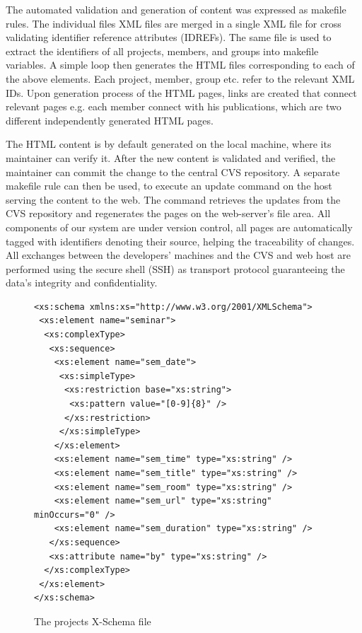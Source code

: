 \documentclass[10pt]{article}
\begin{document}
The automated validation and generation of content was
expressed as makefile rules.
The individual files XML files are merged in a
single XML file for cross validating identifier
reference attributes (IDREFs).
The same file is used to extract the identifiers of
all projects, members, and groups into makefile
variables.
A simple loop then generates the HTML files
corresponding to each of the above elements.
Each project, member, group etc. refer to the relevant XML IDs.
Upon generation process of the HTML pages, links are created that
connect relevant pages e.g. each member connect with his publications, 
which are two different independently generated HTML pages.

The HTML content is by default generated on the
local machine, where its maintainer can verify it.
After the new content is validated and verified,
the maintainer can commit the change to the central  CVS repository. 
A separate makefile rule can then be used,
to execute an update command on the
host serving the content to the web.
The command retrieves the updates from the  CVS
repository and regenerates the pages on the web-server's
file area.
All components of our system are under version control,
all pages are automatically tagged with identifiers
denoting their source, helping the traceability of changes.
All exchanges between the developers' machines and the
CVS and web host are performed using the secure
shell (SSH) as transport protocol guaranteeing the data's integrity
and confidentiality.

\begin{figure}
\lstset{language=MYLANG,basicstyle=\ttfamily}
{\begin{lstlisting}
<xs:schema xmlns:xs="http://www.w3.org/2001/XMLSchema">
 <xs:element name="seminar">
  <xs:complexType>
   <xs:sequence>
    <xs:element name="sem_date">
     <xs:simpleType>
      <xs:restriction base="xs:string">
       <xs:pattern value="[0-9]{8}" />
      </xs:restriction>
     </xs:simpleType>
    </xs:element>
    <xs:element name="sem_time" type="xs:string" />
    <xs:element name="sem_title" type="xs:string" />
    <xs:element name="sem_room" type="xs:string" />
    <xs:element name="sem_url" type="xs:string" minOccurs="0" />
    <xs:element name="sem_duration" type="xs:string" />
   </xs:sequence>
   <xs:attribute name="by" type="xs:string" />
  </xs:complexType>
 </xs:element>
</xs:schema>
\end{lstlisting}}
\caption{The projects X-Schema file}
\label{fig:project-dtd}
\end{figure}
\end{document}
